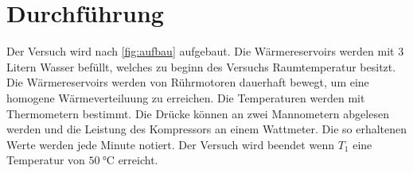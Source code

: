 \section{Durchführung}
\label{sec:Durchführung}
Der Versuch wird nach \ref{fig:aufbau} aufgebaut.
Die Wärmereservoirs werden mit 3 Litern Wasser befüllt, welches zu beginn des Versuchs Raumtemperatur besitzt.
Die Wärmereservoirs werden von Rührmotoren dauerhaft bewegt, um eine homogene Wärmeverteiluung zu erreichen.
Die Temperaturen werden mit Thermometern bestimmt.
Die Drücke können an zwei Mannometern abgelesen werden und die Leistung des Kompressors an einem Wattmeter.
Die so erhaltenen Werte werden jede Minute notiert.
Der Versuch wird beendet wenn $T_1$ eine Temperatur von $\SI{50}{\celsius}$ erreicht.
